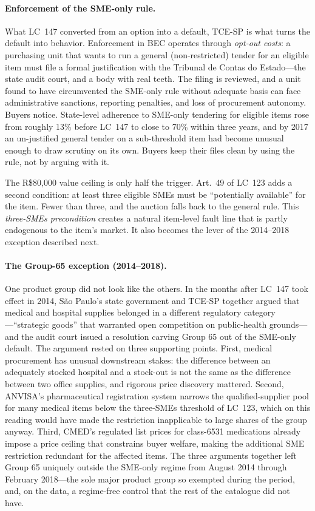 \documentclass[12pt]{article}
\begin{document}
\paragraph{Enforcement of the SME-only rule.}
What LC~147 converted from an option into a default, TCE-SP is
what turns the default into behavior. Enforcement in BEC operates
through \emph{opt-out costs}: a purchasing unit that wants to
run a general (non-restricted) tender for an eligible item must
file a formal justification with the Tribunal de Contas do
Estado---the state audit court, and a body with real teeth. The
filing is reviewed, and a unit found to have circumvented the
SME-only rule without adequate basis can face administrative
sanctions, reporting penalties, and loss of procurement autonomy.
Buyers notice. State-level adherence to SME-only tendering for
eligible items rose from roughly 13\% before LC~147 to close to
70\% within three years, and by 2017 an un-justified general
tender on a sub-threshold item had become unusual enough to draw
scrutiny on its own. Buyers keep their files clean by using the
rule, not by arguing with it.

The R\$80{,}000 value ceiling is only half the trigger. Art.~49
of LC~123 adds a second condition: at least three eligible SMEs
must be ``potentially available'' for the item. Fewer than three,
and the auction falls back to the general rule. This
\emph{three-SMEs precondition} creates a natural item-level fault
line that is partly endogenous to the item's market. It also
becomes the lever of the 2014--2018 exception described next.

\paragraph{The Group-65 exception (2014--2018).}
One product group did not look like the others. In the months
after LC~147 took effect in 2014, São Paulo's state government
and TCE-SP together argued that medical and hospital supplies
belonged in a different regulatory category---``strategic goods''
that warranted open competition on public-health grounds---and
the audit court issued a resolution carving Group 65 out of the
SME-only default. The argument rested on three supporting points.
First, medical procurement has unusual downstream stakes: the
difference between an adequately stocked hospital and a
stock-out is not the same as the difference between two office
supplies, and rigorous price discovery mattered. Second, ANVISA's
pharmaceutical registration system narrows the qualified-supplier
pool for many medical items below the three-SMEs threshold of
LC~123, which on this reading would have made the restriction
inapplicable to large shares of the group anyway. Third, CMED's
regulated list prices for class-6531 medications already impose
a price ceiling that constrains buyer welfare, making the
additional SME restriction redundant for the affected items.
The three arguments together left Group 65 uniquely outside
the SME-only regime from August 2014 through February 2018---the
sole major product group so exempted during the period, and,
on the data, a regime-free control that the rest of the
catalogue did not have.
\end{document}
